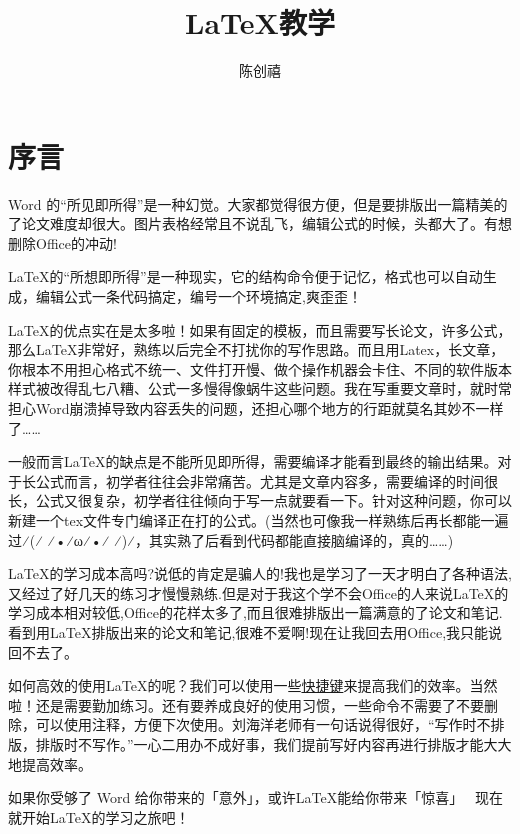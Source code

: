 \documentclass[withoutpreface,bwprint]{cumcmthesis} %
\title{\LaTeX 教学}
\author{陈创禧}
\begin{document}
\maketitle

\section*{序言}
Word 的“所见即所得”是一种幻觉。大家都觉得很方便，但是要排版出一篇精美的了论文难度却很大。图片表格经常且不说乱飞，编辑公式的时候，头都大了。有想删除Office的冲动!

\LaTeX 的“所想即所得”是一种现实，它的结构命令便于记忆，格式也可以自动生成，编辑公式一条代码搞定，编号一个环境搞定,爽歪歪！

\LaTeX 的优点实在是太多啦！如果有固定的模板，而且需要写长论文，许多公式，那么\LaTeX 非常好，熟练以后完全不打扰你的写作思路。而且用Latex，长文章，你根本不用担心格式不统一、文件打开慢、做个操作机器会卡住、不同的软件版本样式被改得乱七八糟、公式一多慢得像蜗牛这些问题。我在写重要文章时，就时常担心Word崩溃掉导致内容丢失的问题，还担心哪个地方的行距就莫名其妙不一样了……

一般而言\LaTeX 的缺点是不能所见即所得，需要编译才能看到最终的输出结果。对于长公式而言，初学者往往会非常痛苦。尤其是文章内容多，需要编译的时间很长，公式又很复杂，初学者往往倾向于写一点就要看一下。针对这种问题，你可以新建一个tex文件专门编译正在打的公式。(当然也可像我一样熟练后再长都能一遍过⁄(⁄ ⁄•⁄ω⁄•⁄ ⁄)⁄，其实熟了后看到代码都能直接脑编译的，真的……)

\LaTeX 的学习成本高吗?说低的肯定是骗人的!我也是学习了一天才明白了各种语法,又经过了好几天的练习才慢慢熟练.但是对于我这个学不会Office的人来说\LaTeX 的学习成本相对较低,Office的花样太多了,而且很难排版出一篇满意的了论文和笔记.看到用\LaTeX 排版出来的论文和笔记,很难不爱啊!现在让我回去用Office,我只能说回不去了。

如何高效的使用\LaTeX 的呢？我们可以使用一些\href{https://zhuanlan.zhihu.com/p/516265230}{快捷键}来提高我们的效率。当然啦！还是需要勤加练习。还有要养成良好的使用习惯，一些命令不需要了不要删除，可以使用注释，方便下次使用。刘海洋老师有一句话说得很好，“写作时不排版，排版时不写作。”一心二用办不成好事，我们提前写好内容再进行排版才能大大地提高效率。

如果你受够了 Word 给你带来的「意外」，或许\LaTeX 能给你带来「惊喜」~ 现在就开始\LaTeX 的学习之旅吧！
\end{document}
